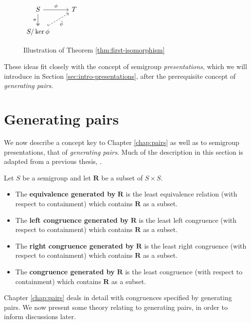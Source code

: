 \begin{figure}[h]
  \centering
  $
  \begin{tikzcd}
    S \ar[d, two heads, "\pi"'] \ar[r, "\phi"] & T \\
    S / \ker{\phi} \ar[ur, dashed, hook, "\bar\phi"']
  \end{tikzcd}
  $
  \caption{Illustration of Theorem \ref{thm:first-isomorphism}}
  \label{fig:first-isomorphism-theorem}
\end{figure}
These ideas fit closely with the concept of semigroup \textit{presentations},
which we will introduce in Section \ref{sec:intro-presentations}, after the
prerequisite concept of \textit{generating pairs}.

\section{Generating pairs}
\label{sec:intro-gen-pairs}

We now describe a concept key to Chapter \ref{chap:pairs} as well as to
semigroup presentations, that of \textit{generating pairs}.  Much of the
description in this section is adapted from a previous thesis,
\cite{mtorpey_msc}.

\begin{definition}
  \label{def:gen-pairs}
  Let $S$ be a semigroup and let $\mathbf{R}$ be a subset of $S \times S$.
  \begin{itemize}
  \item The \textbf{equivalence generated by} $\mathbf{R}$ is the least
    equivalence relation (with respect to containment) which contains
    $\mathbf{R}$ as a subset.
  \item The \textbf{left congruence generated by} $\mathbf{R}$ is the least left
    congruence (with respect to containment) which contains $\mathbf{R}$ as a
    subset.
  \item The \textbf{right congruence generated by} $\mathbf{R}$ is the least
    right congruence (with respect to containment) which contains $\mathbf{R}$
    as a subset.
  \item The \textbf{congruence generated by} $\mathbf{R}$ is the least
    congruence (with respect to containment) which contains $\mathbf{R}$ as a
    subset.
  \end{itemize}
\end{definition}

Chapter \ref{chap:pairs} deals in detail with congruences specified by
generating pairs.  We now present some theory relating to generating pairs, in
order to inform discussions later.

